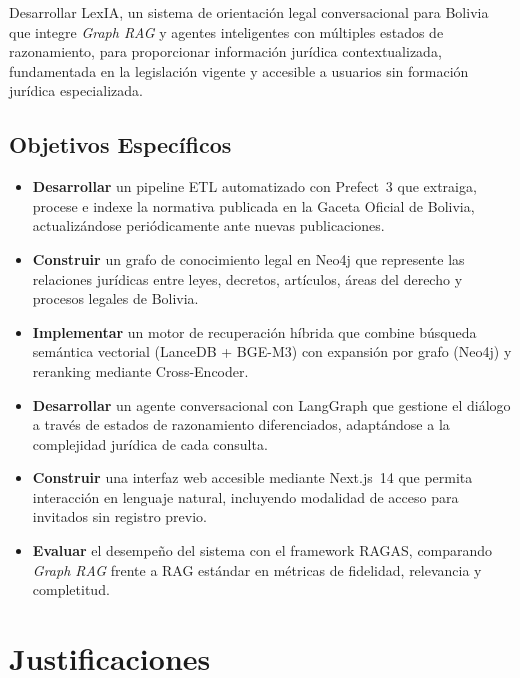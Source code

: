 \documentclass[12pt, letterpaper]{report}
\begin{document}
Desarrollar LexIA, un sistema de orientaci\'{o}n legal conversacional para Bolivia que integre \textit{Graph RAG} y agentes inteligentes con m\'{u}ltiples estados de razonamiento, para proporcionar informaci\'{o}n jur\'{i}dica contextualizada, fundamentada en la legislaci\'{o}n vigente y accesible a usuarios sin formaci\'{o}n jur\'{i}dica especializada.

\subsection{Objetivos Espec\'{i}ficos}

\begin{itemize}
  \item \textbf{Desarrollar} un pipeline ETL automatizado con Prefect~3 que extraiga, procese e indexe la normativa publicada en la Gaceta Oficial de Bolivia, actualiz\'{a}ndose peri\'{o}dicamente ante nuevas publicaciones.

  \item \textbf{Construir} un grafo de conocimiento legal en Neo4j que represente las relaciones jur\'{i}dicas entre leyes, decretos, art\'{i}culos, \'{a}reas del derecho y procesos legales de Bolivia.

  \item \textbf{Implementar} un motor de recuperaci\'{o}n h\'{i}brida que combine b\'{u}squeda sem\'{a}ntica vectorial (LanceDB + BGE-M3) con expansi\'{o}n por grafo (Neo4j) y reranking mediante Cross-Encoder.

  \item \textbf{Desarrollar} un agente conversacional con LangGraph que gestione el di\'{a}logo a trav\'{e}s de estados de razonamiento diferenciados, adapt\'{a}ndose a la complejidad jur\'{i}dica de cada consulta.

  \item \textbf{Construir} una interfaz web accesible mediante Next.js~14 que permita interacci\'{o}n en lenguaje natural, incluyendo modalidad de acceso para invitados sin registro previo.

  \item \textbf{Evaluar} el desempe\~{n}o del sistema con el framework RAGAS, comparando \textit{Graph RAG} frente a RAG est\'{a}ndar en m\'{e}tricas de fidelidad, relevancia y completitud.
\end{itemize}

\section{Justificaciones}
\end{document}

